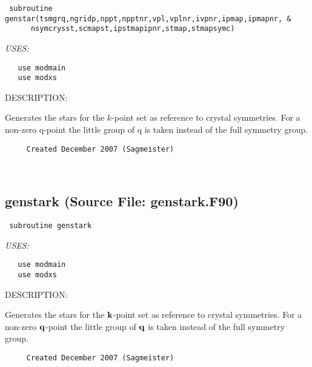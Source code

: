 \documentclass[11pt]{article}
\begin{document}
\begin{verbatim} subroutine genstar(tsmgrq,ngridp,nppt,npptnr,vpl,vplnr,ivpnr,ipmap,ipmapnr, &
      nsymcrysst,scmapst,ipstmapipnr,stmap,stmapsymc)\end{verbatim}{\em USES:}
\begin{verbatim}   use modmain
   use modxs\end{verbatim}
{\sf DESCRIPTION:\\ }


     Generates the stars for the $k$-point set as reference to crystal
     symmetries. For a non-zero q-point the little group of q is taken
     instead of the full symmetry group.
  
\begin{verbatim}     Created December 2007 (Sagmeister)\end{verbatim}


 
 
\mbox{}\hrulefill\ 
 
\subsection{genstark (Source File: genstark.F90)}


\begin{verbatim} subroutine genstark\end{verbatim}{\em USES:}
\begin{verbatim}   use modmain
   use modxs\end{verbatim}
{\sf DESCRIPTION:\\ }


     Generates the stars for the ${\bf k}$-point set as reference to crystal
     symmetries. For a non-zero ${\bf q}$-point the little group of ${\bf q}$
     is taken instead of the full symmetry group.
  
\begin{verbatim}     Created December 2007 (Sagmeister)\end{verbatim}



\end{document}
